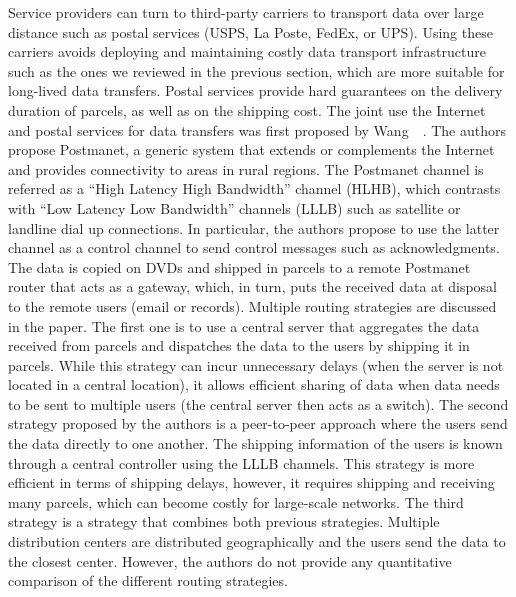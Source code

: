 Service providers can turn to third-party carriers to transport data over large distance such as postal services (\eg USPS, La Poste, FedEx, or UPS). Using these carriers avoids deploying and maintaining costly data transport infrastructure such as the ones we reviewed in the previous section, which are more suitable for long-lived data transfers. Postal services provide hard guarantees on the delivery duration of parcels, as well as on the shipping cost. The joint use the Internet and postal services for data transfers was first proposed by Wang~\etal~\cite{wang2004turning}. The authors propose Postmanet, a generic system that extends or complements the Internet and provides connectivity to areas in rural regions. The Postmanet channel is referred as a ``High Latency High Bandwidth'' channel (HLHB), which contrasts with ``Low Latency Low Bandwidth'' channels (LLLB) such as satellite or landline dial up connections. In particular, the authors propose to use the latter channel as a control channel to send control messages such as acknowledgments. The data is copied on DVDs and shipped in parcels to a remote Postmanet router that acts as a gateway, which, in turn, puts the received data at disposal to the remote users (\eg email or records). Multiple routing strategies are discussed in the paper. The first one is to use a central server that aggregates the data received from parcels and dispatches the data to the users by shipping it in parcels. While this strategy can incur unnecessary delays (\eg when the server is not located in a central location), it allows efficient sharing of data when data needs to be sent to multiple users (the central server then acts as a switch). The second strategy proposed by the authors is a peer-to-peer approach where the users send the data directly to one another. The shipping information of the users is known through a central controller using the LLLB channels. This strategy is more efficient in terms of shipping delays, however, it requires shipping and receiving many parcels, which can become costly for large-scale networks. The third strategy is a strategy that combines both previous strategies. Multiple distribution centers are distributed geographically and the users send the data to the closest center. However, the authors do not provide any quantitative comparison of the different routing strategies. 

